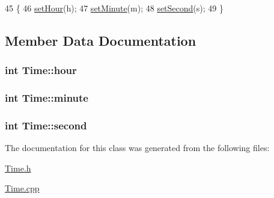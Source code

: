 \begin{DoxyCode}
45                                       \{
46    \hyperlink{classTime_a79e74e17893cf244e1318ceb9b1c7f32}{setHour}(h);
47    \hyperlink{classTime_a35779c16a9db3499a27eccd58793f3b5}{setMinute}(m);
48    \hyperlink{classTime_a0528cf12858546b60ebb33fdcbc3fca2}{setSecond}(s);
49 \}
\end{DoxyCode}


\subsection{Member Data Documentation}
\subsubsection[{\texorpdfstring{hour}{hour}}]{\setlength{\rightskip}{0pt plus 5cm}int Time\+::hour\hspace{0.3cm}{\ttfamily [private]}}\hypertarget{classTime_a497d35aa44ea40706dbab08f7a31d069}{}\label{classTime_a497d35aa44ea40706dbab08f7a31d069}
\subsubsection[{\texorpdfstring{minute}{minute}}]{\setlength{\rightskip}{0pt plus 5cm}int Time\+::minute\hspace{0.3cm}{\ttfamily [private]}}\hypertarget{classTime_a6c2e13147da34803a9784aa2b8bf8da8}{}\label{classTime_a6c2e13147da34803a9784aa2b8bf8da8}
\subsubsection[{\texorpdfstring{second}{second}}]{\setlength{\rightskip}{0pt plus 5cm}int Time\+::second\hspace{0.3cm}{\ttfamily [private]}}\hypertarget{classTime_a63c9e64c7b453e10ba0f7f28bfedbcbf}{}\label{classTime_a63c9e64c7b453e10ba0f7f28bfedbcbf}


The documentation for this class was generated from the following files\+:\begin{DoxyCompactItemize}
\item 
\hyperlink{Time_8h}{Time.\+h}\item 
\hyperlink{Time_8cpp}{Time.\+cpp}\end{DoxyCompactItemize}
